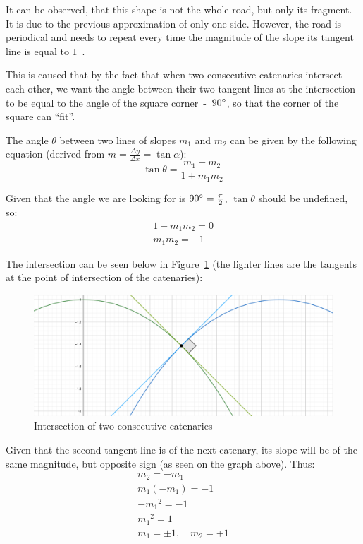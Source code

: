 \documentclass[12pt]{article}
\begin{document}
        It can be observed, that this shape is not the whole road, but only its fragment. It is due to the previous approximation of only one side. However, the road is periodical and needs to repeat every time the magnitude of the slope its tangent line is equal to $1$~\cite{Hall_Wagon_1992}.

        This is caused that by the fact that when two consecutive catenaries intersect each other, we want the angle between their two tangent lines at the intersection to be equal to the angle of the square corner~-~$90\degree$, so that the corner of the square can ``fit''. 

        The angle $\theta$ between two lines of slopes $m_1$ and $m_2$ can be given by the following equation (derived from $m=\frac{\Delta y}{\Delta x}=\tan\alpha$):
        \begin{equation}\label{eq:lines_angle}
            \tan\theta = \frac{m_1 - m_2}{1 + m_1 m_2}
        \end{equation}

        Given that the angle we are looking for is $90\degree = \frac{\pi}{2}$, $\tan\theta$ should be undefined, so:
        \begin{align}
            1 + m_1 m_2 = 0 \\
            m_1 m_2 = -1
        \end{align}

        The intersection can be seen below in Figure~\ref{fig:intersection} (the lighter lines are the tangents at the point of intersection of the catenaries):

        \begin{figure}[H]
            \centering
            \includegraphics[width=0.6\linewidth]{images/slope_1.png}
            \caption[Intersection of two consecutive catenaries]{Intersection of two consecutive catenaries\footnotemark}\label{fig:intersection}
        \end{figure}

        Given that the second tangent line is of the next catenary, its slope will be of the same magnitude, but opposite sign (as seen on the graph above). Thus:
        \begin{align}
            m_2 = - m_1 \label{eq:tangent_intersection} \\
            m_1 (-m_1) = -1 \\
            - {m_1}^2 = -1 \\
            {m_1}^2 = 1 \\
            m_1 = \pm 1, \quad m_2 = \mp 1
        \end{align} 
\end{document}

